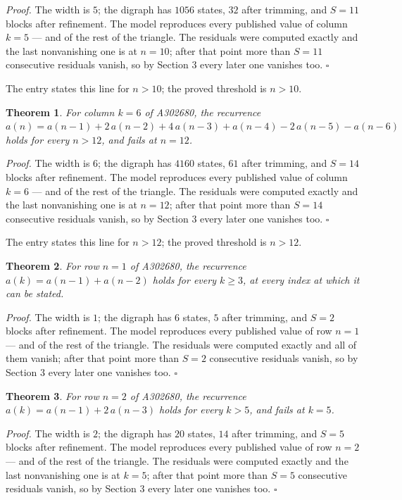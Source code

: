 \documentclass[11pt]{article}
\newtheorem{theorem}{Theorem}
\theoremstyle{definition}
\begin{document}
{\itshape Proof.} The width is $5$; the digraph has $1056$ states, $32$ after trimming, and $S = 11$ blocks after refinement. The model reproduces every published value of column $k = 5$ --- and of the rest of the triangle. The residuals were computed exactly and the last nonvanishing one is at $n = 10$; after that point more than $S = 11$ consecutive residuals vanish, so by Section 3 every later one vanishes too. $\square$

The entry states this line for $n > 10$; the proved threshold is $n > 10$.

\begin{theorem} For column $k = 6$ of A302680, the recurrence $a(n) = a(n-1) + 2\,a(n-2) + 4\,a(n-3) + a(n-4) - 2\,a(n-5) - a(n-6)$ holds for every $n > 12$, and fails at $n = 12$.\end{theorem}

{\itshape Proof.} The width is $6$; the digraph has $4160$ states, $61$ after trimming, and $S = 14$ blocks after refinement. The model reproduces every published value of column $k = 6$ --- and of the rest of the triangle. The residuals were computed exactly and the last nonvanishing one is at $n = 12$; after that point more than $S = 14$ consecutive residuals vanish, so by Section 3 every later one vanishes too. $\square$

The entry states this line for $n > 12$; the proved threshold is $n > 12$.

\begin{theorem} For row $n = 1$ of A302680, the recurrence $a(k) = a(n-1) + a(n-2)$ holds for every $k \ge 3$, at every index at which it can be stated.\end{theorem}

{\itshape Proof.} The width is $1$; the digraph has $6$ states, $5$ after trimming, and $S = 2$ blocks after refinement. The model reproduces every published value of row $n = 1$ --- and of the rest of the triangle. The residuals were computed exactly and all of them vanish; after that point more than $S = 2$ consecutive residuals vanish, so by Section 3 every later one vanishes too. $\square$

\begin{theorem} For row $n = 2$ of A302680, the recurrence $a(k) = a(n-1) + 2\,a(n-3)$ holds for every $k > 5$, and fails at $k = 5$.\end{theorem}

{\itshape Proof.} The width is $2$; the digraph has $20$ states, $14$ after trimming, and $S = 5$ blocks after refinement. The model reproduces every published value of row $n = 2$ --- and of the rest of the triangle. The residuals were computed exactly and the last nonvanishing one is at $k = 5$; after that point more than $S = 5$ consecutive residuals vanish, so by Section 3 every later one vanishes too. $\square$
\end{document}
